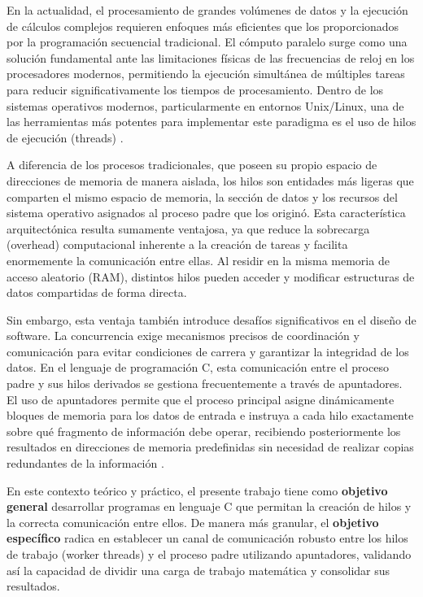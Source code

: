 En la actualidad, el procesamiento de grandes volúmenes de datos y la ejecución de cálculos complejos requieren enfoques más eficientes que los proporcionados por la programación secuencial tradicional. El cómputo paralelo surge como una solución fundamental ante las limitaciones físicas de las frecuencias de reloj en los procesadores modernos, permitiendo la ejecución simultánea de múltiples tareas para reducir significativamente los tiempos de procesamiento. Dentro de los sistemas operativos modernos, particularmente en entornos Unix/Linux, una de las herramientas más potentes para implementar este paradigma es el uso de hilos de ejecución (threads) \cite{marquez:unix-programacion:2015}.

A diferencia de los procesos tradicionales, que poseen su propio espacio de direcciones de memoria de manera aislada, los hilos son entidades más ligeras que comparten el mismo espacio de memoria, la sección de datos y los recursos del sistema operativo asignados al proceso padre que los originó. Esta característica arquitectónica resulta sumamente ventajosa, ya que reduce la sobrecarga (overhead) computacional inherente a la creación de tareas y facilita enormemente la comunicación entre ellas. Al residir en la misma memoria de acceso aleatorio (RAM), distintos hilos pueden acceder y modificar estructuras de datos compartidas de forma directa. 

Sin embargo, esta ventaja también introduce desafíos significativos en el diseño de software. La concurrencia exige mecanismos precisos de coordinación y comunicación para evitar condiciones de carrera y garantizar la integridad de los datos. En el lenguaje de programación C, esta comunicación entre el proceso padre y sus hilos derivados se gestiona frecuentemente a través de apuntadores. El uso de apuntadores permite que el proceso principal asigne dinámicamente bloques de memoria para los datos de entrada e instruya a cada hilo exactamente sobre qué fragmento de información debe operar, recibiendo posteriormente los resultados en direcciones de memoria predefinidas sin necesidad de realizar copias redundantes de la información \cite{marquez:unix-programacion:2015}.

En este contexto teórico y práctico, el presente trabajo tiene como \textbf{objetivo general} desarrollar programas en lenguaje C que permitan la creación de hilos y la correcta comunicación entre ellos. De manera más granular, el \textbf{objetivo específico} radica en establecer un canal de comunicación robusto entre los hilos de trabajo (worker threads) y el proceso padre utilizando apuntadores, validando así la capacidad de dividir una carga de trabajo matemática y consolidar sus resultados.

